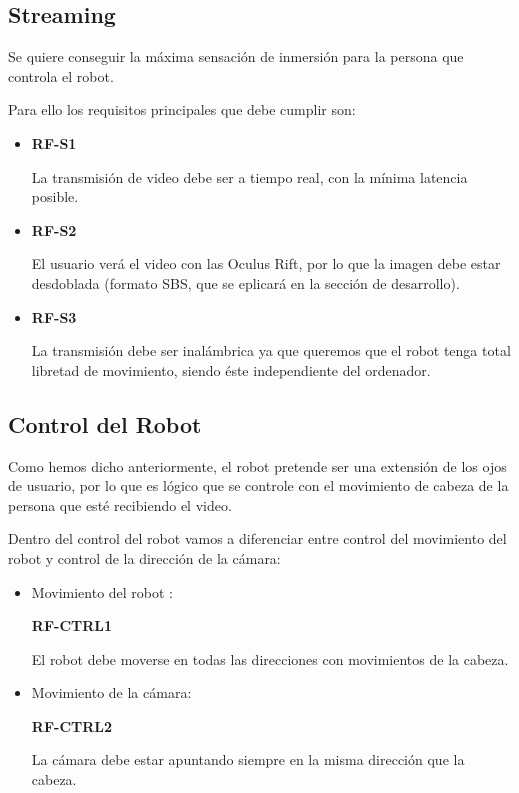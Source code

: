 \documentclass[twoside, 11pt]{epstfg}
\begin{document}
\subsection{Streaming}
Se quiere conseguir la máxima sensación de inmersión para la persona que controla el robot.

Para ello los requisitos principales que debe cumplir son:

\begin{itemize}
	\item\textbf{RF-S1}
	
	La transmisión de video debe ser  a tiempo real, con la mínima latencia posible.
	
	\item\textbf{RF-S2}
	
	El usuario verá el video con  las Oculus Rift, por lo que la imagen debe estar desdoblada (formato SBS, que se eplicará en la sección de desarrollo).
	
	\item\textbf{RF-S3}
	
	La transmisión debe ser inalámbrica ya que queremos que el robot tenga total libretad de movimiento, siendo éste independiente del ordenador.
	
	
\end{itemize}



\subsection{Control del Robot}

Como hemos dicho anteriormente, el robot pretende ser una extensión de los ojos de usuario, por lo que es lógico que se controle con el movimiento de cabeza de la persona que esté recibiendo el video.

Dentro del control del robot vamos a diferenciar entre control del movimiento del robot y control de la dirección de la cámara:

\begin{itemize}
	\item Movimiento del robot :
	
	\textbf{RF-CTRL1}
	
	El robot debe moverse en todas las direcciones con movimientos de la cabeza.
	\item  Movimiento de la cámara:
	
	\textbf{RF-CTRL2}
	
	La cámara debe estar apuntando siempre en la misma dirección que la cabeza.
	
\end{itemize}
\end{document}
